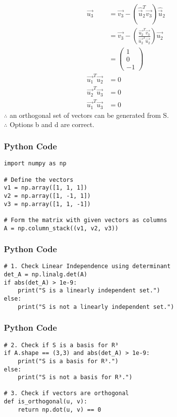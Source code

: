 \documentclass{beamer}
\begin{document}
\begin{frame}
\begin{align}
\vec{u_3} &= \vec{v_3} - (\hat{\vec{u}}_2^T \vec{v_3}) \hat{\vec{u}}_2 \\&= \vec{v_3} - \left( \frac{\vec{u_2}^T \vec{v_3}}{\vec{u_2}^T \vec{u_2}} \right) \vec{u_2} \\&= \begin{pmatrix} 1 \\ 0 \\ -1 \end{pmatrix}\\
\vec{u_1}^T \vec{u_2} &= 0 \\\vec{u_2}^T \vec{u_3} &= 0 \\\vec{u_1}^T \vec{u_3} &= 0
\end{align}
$\therefore$ an orthogonal set of vectors can be generated from S.\\
$\therefore$ Options b and d are correct.
\end{frame}


\begin{frame}[fragile]
    \frametitle{Python Code}
    \begin{lstlisting}
import numpy as np

# Define the vectors
v1 = np.array([1, 1, 1])
v2 = np.array([1, -1, 1])
v3 = np.array([1, 1, -1])

# Form the matrix with given vectors as columns
A = np.column_stack((v1, v2, v3))
\end{lstlisting}
\end{frame}

\begin{frame}[fragile]
\frametitle{Python Code}
\begin{lstlisting}
# 1. Check Linear Independence using determinant
det_A = np.linalg.det(A)
if abs(det_A) > 1e-9:
    print("S is a linearly independent set.")
else:
    print("S is not a linearly independent set.")
\end{lstlisting}
\end{frame}

\begin{frame}[fragile]
\frametitle{Python Code}
\begin{lstlisting}
# 2. Check if S is a basis for R³
if A.shape == (3,3) and abs(det_A) > 1e-9:
    print("S is a basis for R³.")
else:
    print("S is not a basis for R³.")

# 3. Check if vectors are orthogonal
def is_orthogonal(u, v):
    return np.dot(u, v) == 0
\end{lstlisting}
\end{frame}
\end{document}
